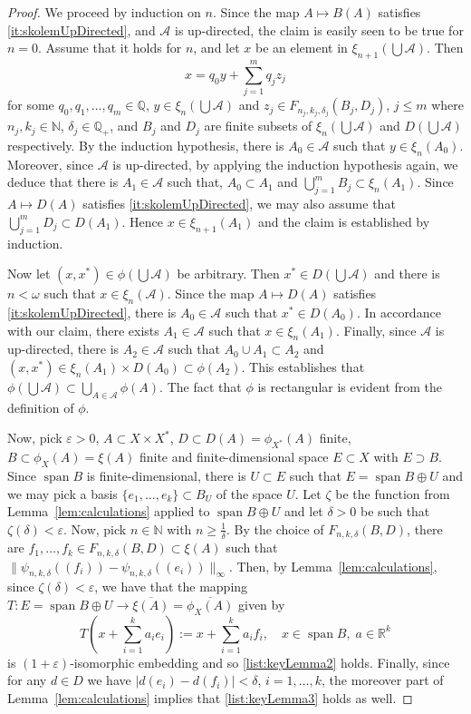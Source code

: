 \documentclass[11pt]{amsart}
\theoremstyle{definition}
\theoremstyle{remark}
\newcommand{\Rea}{\mathbb R}
\newcommand{\Nat}{\mathbb N}
\newcommand{\Rat}{\mathbb Q}
\newcommand{\A}{\mathcal A}
\newcommand{\Span}{\operatorname{span}}
\begin{document}
\begin{proof}
We proceed by induction on $n$. Since the map $A\mapsto B(A)$ satisfies \ref{it:skolemUpDirected}, and $\mathcal{A}$ is up-directed, the claim is easily seen to be true for $n=0$. Assume that it holds for $n$, and let $x$ be an element in $\xi_{n+1}(\bigcup \mathcal{A})$. Then
\[x=q_0y+\sum_{j=1}^mq_jz_j\]
for some $q_0,q_1,\ldots,q_m\in\Rat$, $y\in \xi_n(\bigcup \mathcal{A})$ and $z_j\in F_{n_j,k_j,\delta_j}(B_j,D_j)$, $j\leq m$ where $n_j,k_j\in\Nat$, 
$\delta_j\in\Rat_+$, and $B_j$ and $D_j$ are finite subsets of $\xi_n(\bigcup \mathcal{A})$ and $D(\bigcup \mathcal{A})$ respectively. By the induction hypothesis, there is $A_0\in \mathcal{A}$ such that $y\in \xi_n(A_0)$. Moreover, since $\mathcal{A}$ is up-directed, by applying the induction hypothesis again, we deduce that there is $A_1\in \mathcal{A}$ such that, $A_0\subset A_1$ and $\bigcup_{j=1}^mB_j\subset \xi_n(A_1)$. Since $A\mapsto D(A)$ satisfies \ref{it:skolemUpDirected}, we may also assume that $\bigcup_{j=1}^mD_j\subset D(A_1)$. Hence $x\in \xi_{n+1}(A_1)$ and the claim is established by induction.

Now let $(x,x^*)\in \phi(\bigcup \mathcal{A})$ be arbitrary. Then $x^*\in D(\bigcup \mathcal{A})$ and there is $n<\omega$ such that 
$x\in \xi_n(\mathcal{A})$. Since the map $A\mapsto D(A)$ satisfies \ref{it:skolemUpDirected}, there is $A_0\in\A$ such that $x^*\in D(A_0)$. In accordance with our claim, there exists $A_1\in \mathcal{A}$ such that $x\in \xi_n(A_1)$. Finally, since $\mathcal{A}$ is up-directed, there is $A_2\in\mathcal{A}$ such that $A_0\cup A_1\subset A_2$ and $(x,x^*)\in \xi_n(A_1)\times D(A_0)\subset \phi(A_2)$.
This establishes that $\phi(\bigcup \mathcal{A})\subset \bigcup_{A\in \mathcal{A}}\phi(A)$. 
The fact that $\phi$ is rectangular is evident from the definition of $\phi$.

Now, pick $\varepsilon>0$, $A\subset X\times X^*$, $D\subset D(A) = \phi_{X^*}(A)$ finite, $B\subset \phi_X(A) = \xi(A)$ finite and finite-dimensional space $E\subset X$ with $E\supset B$. Since $\Span B$ is finite-dimensional, there is $U\subset E$ such that $E = \Span B\oplus U$ and we may pick a basis $\{e_1,\ldots,e_k\}\subset B_U$ of the space $U$. Let $\zeta$ be the function from Lemma~\ref{lem:calculations} applied to $\Span B\oplus U$ and let $\delta>0$ be such that $\zeta(\delta)<\varepsilon$. Now, pick $n\in \Nat$ with $n\geq \tfrac{1}{\delta}$. By the choice of $F_{n,k,\delta}(B,D)$, there are $f_1,\ldots,f_k\in F_{n,k,\delta}(B,D)\subset \xi(A)$ such that $\|\psi_{n,k,\delta}((f_i)) - \psi_{n,k,\delta}((e_i))\|_\infty$. Then, by Lemma~\ref{lem:calculations}, since $\zeta(\delta)<\varepsilon$, we have that the mapping $T:E = \Span B\oplus U\to \overline{\xi(A)} = \overline{\phi_X(A)}$ given by
 \[
 T(x+\sum_{i=1}^{k}a_i e_i):=x+\sum_{i=1}^{k}a_i f_i,\quad x\in \Span B,\; a\in \Rea^{k}
 \]
 is $(1+\varepsilon)$-isomorphic embedding and so \ref{list:keyLemma2} holds. Finally, since for any $d\in D$ we have $|d(e_i)-d(f_i)|<\delta$, $i=1,\ldots,k$, the moreover part of Lemma~\ref{lem:calculations} implies that \ref{list:keyLemma3} holds as well.
\end{proof}
\end{document}
